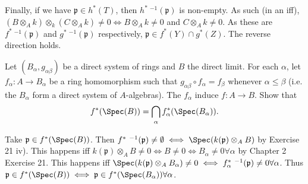 \documentclass[a4paper]{exam}
\begin{document}
\begin{questions}
\begin{solution}
	Finally, if we have $\mathfrak{p}\in h^\ast(T) $, then $h^\ast\ ^{-1}(\mathfrak{p}) $ is non-empty.
	As such (in an iff), $(B \otimes _A k) \otimes _k (C \otimes _A k) \ne 0 \iff B \otimes _A k \ne 0 $ and $C \otimes _A k \ne 0 $.
	As these are $f^\ast\ ^{-1}(\mathfrak{p}) $ and $g^\ast\ ^{-1}(\mathfrak{p})$ respectively, $\mathfrak{p} \in f^\ast(Y) \cap g^\ast(Z) $.
	The reverse direction holds.
\end{solution}

\question Let $(B_{\alpha }, g_{\alpha \beta}) $ be a direct system of rings and $B $ the direct limit. For each $\alpha $, let $f_{\alpha}: A\to B_{\alpha} $ be a ring homomorphism such that $g_{\alpha \beta} \circ f_{\alpha} = f_{\beta}$ whenever $\alpha\le \beta $ (i.e. the $B_{\alpha} $ form a direct system of $A $-algebras). The $f_{\alpha} $ induce $f:A\to B $. Show that
\[
	f^\ast(\Spec(B)) = \bigcap_{\alpha} f^\ast_ \alpha (\Spec(B_ \alpha))
.\] 
\begin{solution}
	Take $\mathfrak{p} \in f^\ast(\Spec(B)) $.
	Then $f^\ast\ ^{-1}(\mathfrak{p}) \ne \emptyset \iff \Spec(k(\mathfrak{p}) \otimes _A B)$ by Exercise 21 iv).
	This happens iff $k(\mathfrak{p}) \otimes _A B \ne 0 \iff B \ne 0 \iff B_ \alpha \ne 0 \forall \alpha$ by Chapter 2 Exercise 21.
	This happens iff $\Spec(k(\mathfrak{p}) \otimes _A B_ \alpha) \ne 0 \iff f_ \alpha^\ast\ ^{-1}(\mathfrak{p}) \ne 0 \forall \alpha $.
	Thus $\mathfrak{p} \in f^\ast(\Spec(B)) \iff \mathfrak{p} \in f^\ast(\Spec(B_ \alpha)) \forall \alpha$.
\end{solution}


\end{questions}
\end{document}
